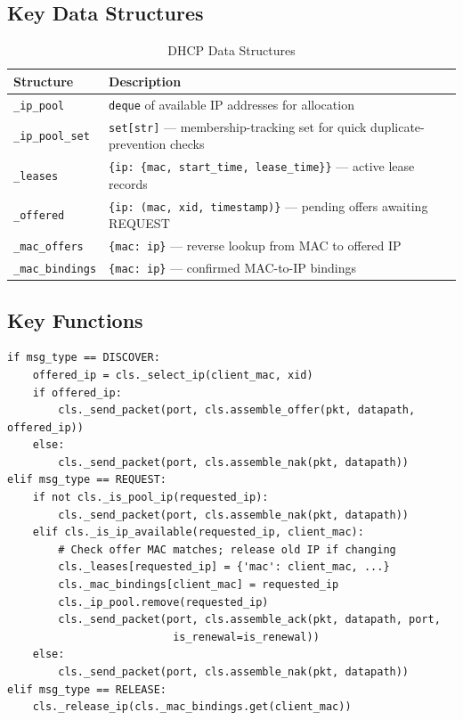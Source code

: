 \documentclass[12pt,a4paper]{article}
\begin{document}
\subsection{Key Data Structures}

\begin{table}[H]
\centering
\begin{tabular}{@{}lp{8cm}@{}}
\toprule
\textbf{Structure} & \textbf{Description} \\
\midrule
\texttt{\_ip\_pool} & \texttt{deque} of available IP addresses for allocation \\
\texttt{\_ip\_pool\_set} & \texttt{set[str]} --- membership-tracking set for quick duplicate-prevention checks \\
\texttt{\_leases} & \texttt{\{ip: \{mac, start\_time, lease\_time\}\}} --- active lease records \\
\texttt{\_offered} & \texttt{\{ip: (mac, xid, timestamp)\}} --- pending offers awaiting REQUEST \\
\texttt{\_mac\_offers} & \texttt{\{mac: ip\}} --- reverse lookup from MAC to offered IP \\
\texttt{\_mac\_bindings} & \texttt{\{mac: ip\}} --- confirmed MAC-to-IP bindings \\
\bottomrule
\end{tabular}
\caption{DHCP Data Structures}
\end{table}

\subsection{Key Functions}

\begin{lstlisting}[caption={DHCP Main Dispatcher (abridged)}]
if msg_type == DISCOVER:
    offered_ip = cls._select_ip(client_mac, xid)
    if offered_ip:
        cls._send_packet(port, cls.assemble_offer(pkt, datapath, offered_ip))
    else:
        cls._send_packet(port, cls.assemble_nak(pkt, datapath))
elif msg_type == REQUEST:
    if not cls._is_pool_ip(requested_ip):
        cls._send_packet(port, cls.assemble_nak(pkt, datapath))
    elif cls._is_ip_available(requested_ip, client_mac):
        # Check offer MAC matches; release old IP if changing
        cls._leases[requested_ip] = {'mac': client_mac, ...}
        cls._mac_bindings[client_mac] = requested_ip
        cls._ip_pool.remove(requested_ip)
        cls._send_packet(port, cls.assemble_ack(pkt, datapath, port,
                          is_renewal=is_renewal))
    else:
        cls._send_packet(port, cls.assemble_nak(pkt, datapath))
elif msg_type == RELEASE:
    cls._release_ip(cls._mac_bindings.get(client_mac))
\end{lstlisting}
\end{document}
